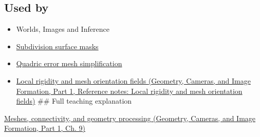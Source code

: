 \subsection{Used by}\label{appendix-1aea26b2307f-used-by}

\hypertarget{appendix-1aea26b2307f-used-by}{}

\begin{itemize}
\item
  {Worlds, Images and Inference}
\item
  \hyperref[appendix-0234ab7f86b1]{Subdivision surface masks}
\item
  \hyperref[appendix-1dd4ad54ca57]{Quadric error mesh simplification}
\item
  \href{../03-Geometry-Cameras-and-Image-Formation-P01/main.pdf\#nameddest=appendix-7107009c505b}{Local rigidity and mesh orientation fields (Geometry, Cameras, and Image Formation, Part 1, Reference notes: Local rigidity and mesh orientation fields)} \#\# Full teaching explanation
\end{itemize}

\href{../03-Geometry-Cameras-and-Image-Formation-P01/main.pdf\#nameddest=03-visual-computing-i-ch002-meshes-connectivity-and-geometry-processing}{Meshes, connectivity, and geometry processing (Geometry, Cameras, and Image Formation, Part 1, Ch. 9)}
